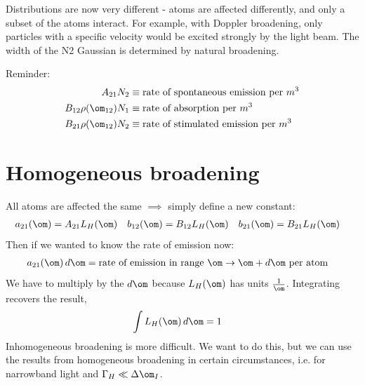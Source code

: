 \documentclass[a4paper, 11pt, normalem]{report}
\begin{document}
\begin{example}
\begin{enumerate}
\begin{figure}[H]
        \end{figure}
        Distributions are now very different - atoms are affected differently, and only a subset of the atoms interact.
        For example, with Doppler broadening, only particles with a specific velocity would be excited strongly by the light beam.
        The width of the N2 Gaussian is determined by natural broadening.
\end{enumerate}
\end{example}
Reminder:
\begin{align}
    A_{21}N_2 &\equiv \text{rate of spontaneous emission per }m^3 \\
    B_{12}\rho(\om_{12})N_1 &\equiv \text{rate of absorption per }m^3 \\
    B_{21}\rho(\om_{12})N_2 &\equiv \text{rate of stimulated emission per }m^3
\end{align}
\section{Homogeneous broadening}
All atoms are affected the same $\implies$ simply define a new constant:
\begin{align}
    a_{21}(\om) &= A_{21}L_H(\om) & b_{12}(\om) &= B_{12}L_H(\om) & b_{21}(\om) &= B_{21}L_H(\om)
\end{align}
Then if we wanted to know the rate of emission now:
\begin{align}
    a_{21}(\om)\,d\om &= \text{rate of emission in range $\om\to\om+d\om$ per atom}
\end{align}
We have to multiply by the $d\om$ because $L_H(\om)$ has units $\frac{1}{\om}$.
Integrating recovers the result,
\begin{align}
    \int L_H(\om)\,d\om &= 1
\end{align}
Inhomogeneous broadening is more difficult.
We want to do this, but we can use the results from homogeneous broadening in certain circumstances, i.e. for narrowband light and $\Gamma_H \ll \Delta\om_I$.
\end{document}
